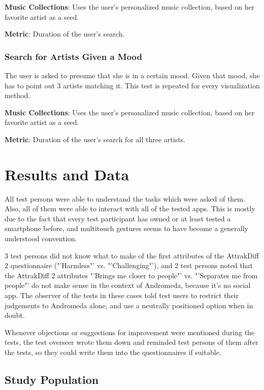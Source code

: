 \textbf{Music Collections}: Uses the user's personalized music collection, based on her favorite artist as a seed.

\textbf{Metric}: Duration of the user's search.

	
\subsubsection{Search for Artists Given a Mood}
	
The user is asked to presume that she is in a certain mood. Given that mood, she has to point out 3 artists matching it. This test is repeated for every visualization method.
	
\textbf{Music Collections}: Uses the user's personalized music collection, based on her favorite artist as a seed.
	
\textbf{Metric}: Duration of the user's search for all three artists.


\section{Results and Data}

All test persons were able to understand the tasks which were asked of them. Also, all of them were able to interact with all of the tested apps. This is mostly due to the fact that every test participant has owned or at least tested a smartphone before, and multitouch gestures seems to have become a generally understood convention.

3 test persons did not know what to make of the first attributes of the AttrakDiff 2 questionnaire ("'Harmless"' vs. "'Challenging"'), and 2 test persons noted that the AttrakDiff 2 attributes "'Brings me closer to people"' vs. "'Separates me from people"' do not make sense in the context of Andromeda, because it's no social app. The observer of the tests in these cases told test users to restrict their judgements to Andromeda alone, and use a neutrally positioned option when in doubt.

Whenever objections or suggestions for improvement were mentioned during the tests, the test overseer wrote them down and reminded test persons of them after the tests, so they could write them into the questionnaires if suitable.

\subsection{Study Population}

